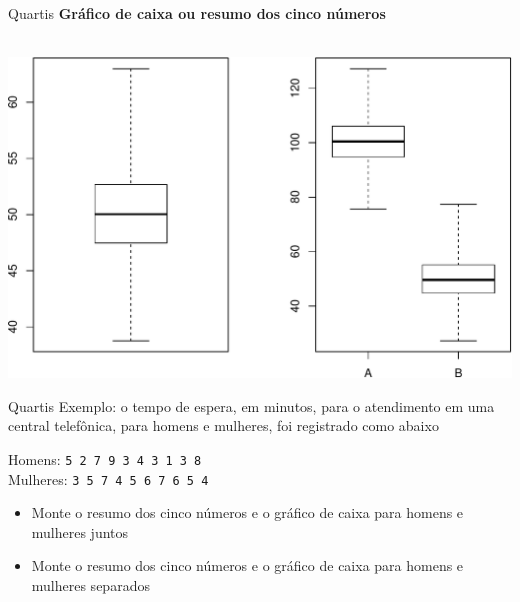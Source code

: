 \documentclass[10pt]{beamer}\usepackage[]{graphicx}\usepackage[]{color}
\newenvironment{knitrout}{}{} %
\theoremstyle{definition}
\begin{document}
\begin{frame}{Quartis}
  \textbf{Gráfico de caixa ou resumo dos cinco números}\\~\\
\begin{knitrout}\footnotesize
{}\color{fgcolor}

{\centering \includegraphics[width=.9\textwidth]{figure/unnamed-chunk-10-1} 

}



\end{knitrout}
\end{frame}

\begin{frame}{Quartis}
  Exemplo: o tempo de espera, em minutos, para o atendimento em uma
  central telefônica, para homens e mulheres, foi registrado como abaixo
  \begin{center}
    Homens: \texttt{5 2 7 9 3 4 3 1 3 8}\\
    Mulheres: \texttt{3 5 7 4 5 6 7 6 5 4}
  \end{center}
  \begin{itemize}
  \item Monte o resumo dos cinco números e o gráfico de caixa para
    homens e mulheres juntos
  \item Monte o resumo dos cinco números e o gráfico de caixa para
    homens e mulheres separados
  \end{itemize}

\end{frame}
\end{document}
